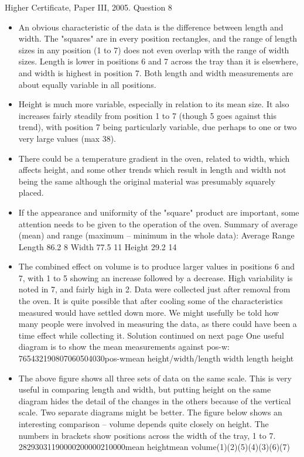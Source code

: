 \documentclass[a4paper,12pt]{article}
\begin{document}
Higher Certificate, Paper III, 2005. Question 8
\begin{itemize}
    \item An obvious characteristic of the data is the difference between length and width. The "squares" are in every position rectangles, and the range of length sizes in any position (1 to 7) does not even overlap with the range of width sizes. Length is lower in positions 6 and 7 across the tray than it is elsewhere, and width is highest in position 7. Both length and width measurements are about equally variable in all positions.
\item 
Height is much more variable, especially in relation to its mean size. It also increases fairly steadily from position 1 to 7 (though 5 goes against this trend), with position 7 being particularly variable, due perhaps to one or two very large values (max 38).
\item There could be a temperature gradient in the oven, related to width, which affects height, and some other trends which result in length and width not being the same although the original material was presumably squarely placed.
\item If the appearance and uniformity of the "square" product are important, some attention needs to be given to the operation of the oven.
Summary of average (mean) and range (maximum – minimum in the whole data):
Average Range
Length 86.2 8
Width 77.5 11
Height 29.2 14
\item The combined effect on volume is to produce larger values in positions 6 and 7, with 1 to 5 showing an increase followed by a decrease. High variability is noted in 7, and fairly high in 2.
Data were collected just after removal from the oven. It is quite possible that after cooling some of the characteristics measured would have settled down more. We might usefully be told how many people were involved in measuring the data, as there could have been a time effect while collecting it.
Solution continued on next page
One useful diagram is to show the mean measurements against pos-w: 765432190807060504030pos-wmean height/width/length
width
length
height
\item The above figure shows all three sets of data on the same scale. This is very useful in comparing length and width, but putting height on the same diagram hides the detail of the changes in the others because of the vertical scale. Two separate diagrams might be better.
The figure below shows an interesting comparison – volume depends quite closely on height. The numbers in brackets show positions across the width of the tray, 1 to 7. 28293031190000200000210000mean heightmean volume(1)(2)(5)(4)(3)(6)(7)\end{itemize}
\end{document}

